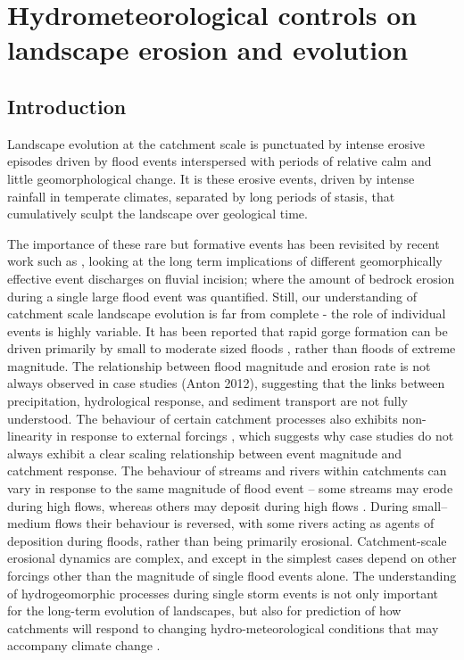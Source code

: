 \chapter{Hydrometeorological controls on landscape erosion and evolution}
\label{chapter_hydrogeomorph}

\section{Introduction}

Landscape evolution at the catchment scale is punctuated by intense erosive episodes driven by flood events \citep{Wolman1960,newson1980geomorphological,Costa1995} interspersed with periods of relative calm and little geomorphological change. It is these erosive events, driven by intense rainfall in temperate climates, separated by long periods of stasis, that cumulatively sculpt the landscape over geological time. 

The importance of these rare but formative events has been revisited by recent work such as \citet{Huang2006}, looking at the long term implications of different geomorphically effective event discharges on fluvial incision; \citep{gupta2007catastrophic,lamb2010rapid,baynes2015erosion} where the amount of bedrock erosion during a single large flood event was quantified. Still, our understanding of catchment scale landscape evolution is far from complete - the role of individual events is highly variable. It has been reported that rapid gorge formation can be driven primarily by small to moderate sized floods \citep{anton2015exceptional}, rather than floods of extreme magnitude. The relationship between flood magnitude and erosion rate is not always observed in case studies (Anton 2012), suggesting that the links between precipitation, hydrological response, and sediment transport are not fully understood. The behaviour of certain catchment processes also exhibits non-linearity in response to external forcings \citep{coulthard1998non,coulthard2007cellular}, which suggests why case studies do not always exhibit a clear scaling relationship between event magnitude and catchment response. The behaviour of streams and rivers within catchments can vary in response to the same magnitude of flood event -- some streams may erode during high flows, whereas others may deposit during high flows \citep{turowski2013large}. During small--medium flows their behaviour is reversed, with some rivers acting as agents of deposition during floods, rather than being primarily erosional.  Catchment-scale erosional dynamics are complex, and except in the simplest cases depend on other forcings other than the magnitude of single flood events alone.  The understanding of hydrogeomorphic processes during single storm events is not only important for the long-term evolution of landscapes, but also for prediction of how catchments will respond to changing hydro-meteorological conditions that may accompany climate change \citep{Kendon2014}.

